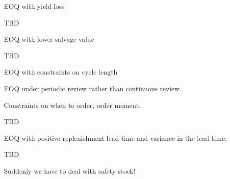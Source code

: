 \begin{question}
EOQ with yield loss
  \begin{solution}
    TBD
  \end{solution}
\end{question}

\begin{question}
EOQ with lower salvage value
  \begin{solution}
    TBD
  \end{solution}
\end{question}


\begin{question}
EOQ with constraints on cycle length

EOQ under periodic review rather than continuous review.

Constraints on when to order, order moment.

  \begin{solution}
    TBD
  \end{solution}
\end{question}


\begin{question}
  EOQ with positive replenishment lead time and variance in the lead
  time.

  \begin{solution}
    TBD

Suddenly we have to deal with safety stock!
  \end{solution}
\end{question}

